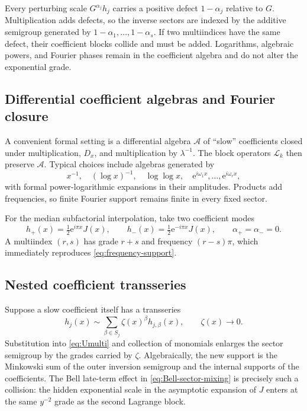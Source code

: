 \documentclass[11pt,oneside]{article}
\theoremstyle{plain}
\theoremstyle{definition}
\theoremstyle{remark}
\newcommand{\ee}{\mathrm{e}}
\newcommand{\Lcal}{\mathcal{L}}
\newcommand{\Acal}{\mathcal{A}}
\begin{document}
\begin{methodbox}[title={How to read the grading rule}]
Every perturbing scale \(G^{\alpha_j}h_j\) carries a positive defect
\(1-\alpha_j\) relative to \(G\).  Multiplication adds defects, so the inverse
sectors are indexed by the additive semigroup generated by
\(1-\alpha_1,\ldots,1-\alpha_s\).  If two multiindices have the same defect,
their coefficient blocks collide and must be added.  Logarithms, algebraic
powers, and Fourier phases remain in the coefficient algebra and do not alter
the exponential grade.
\end{methodbox}

\subsection{Differential coefficient algebras and Fourier closure}

A convenient formal setting is a differential algebra \(\Acal\) of ``slow''
coefficients closed under multiplication, \(D_x\), and multiplication by
\(\lambda^{-1}\).  The block operators \(\Lcal_k\) then preserve
\(\Acal\).  Typical choices include algebras generated by
\begin{equation}
 x^{-1},\quad (\log x)^{-1},\quad \log\log x,
 \quad \ee^{i\omega_1x},\ldots,\ee^{i\omega_rx},
 \label{eq:coefficient-generators}
\end{equation}
with formal power-logarithmic expansions in their amplitudes.  Products add
frequencies, so finite Fourier support remains finite in every fixed sector.

For the median subfactorial interpolation, take two coefficient modes
\begin{equation}
 h_+(x)=\tfrac12\ee^{i\pi x}J(x),
 \qquad
 h_-(x)=\tfrac12\ee^{-i\pi x}J(x),
 \qquad \alpha_+=\alpha_-=0.
 \label{eq:subfactorial-two-modes}
\end{equation}
A multiindex \((r,s)\) has grade \(r+s\) and frequency \((r-s)\pi\), which
immediately reproduces \eqref{eq:frequency-support}.

\subsection{Nested coefficient transseries}

Suppose a slow coefficient itself has a transseries
\begin{equation}
 h_j(x)\sim\sum_{\beta\in S_j}
 \zeta(x)^\beta h_{j,\beta}(x),
 \qquad \zeta(x)\to0.
 \label{eq:nested-coefficient-transseries}
\end{equation}
Substitution into \eqref{eq:Umulti} and collection of monomials enlarges the
sector semigroup by the grades carried by \(\zeta\).  Algebraically, the new
support is the Minkowski sum of the outer inversion semigroup and the internal
supports of the coefficients.  The Bell late-term effect in
\eqref{eq:Bell-sector-mixing} is precisely such a collision: the hidden
exponential scale in the asymptotic expansion of \(J\) enters at the same
\(y^{-2}\) grade as the second Lagrange block.
\end{document}

